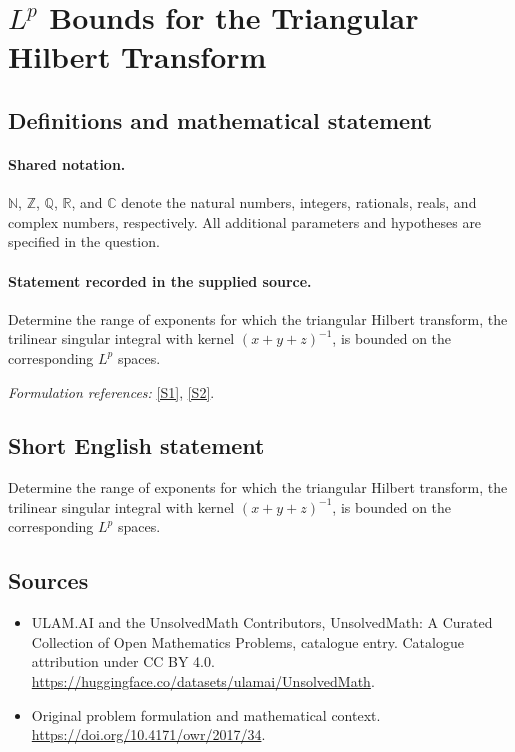 \documentclass[11pt]{article}
\newcommand{\sref}[2]{\hyperlink{source:#1:#2}{[S#2]}}
\begin{document}
\section{\texorpdfstring{$L^p$ Bounds for the Triangular Hilbert Transform}{L\textasciicircum{}p Bounds for the Triangular Hilbert Transform}}\label{statement}

\subsection{Definitions and mathematical statement}

\paragraph{Shared notation.}$\mathbb N$, $\mathbb Z$, $\mathbb Q$, $\mathbb R$, and $\mathbb C$ denote the natural numbers, integers, rationals, reals, and complex numbers, respectively. All additional parameters and hypotheses are specified in the question.


\paragraph{Statement recorded in the supplied source.}
Determine the range of exponents for which the triangular Hilbert transform, the trilinear singular integral with kernel $(x+y+z)^{-1}$, is bounded on the corresponding $L^p$ spaces.
\par\smallskip\textit{Formulation references:} \sref{statement}{1}, \sref{statement}{2}.
\subsection{Short English statement}
Determine the range of exponents for which the triangular Hilbert transform, the trilinear singular integral with kernel $(x+y+z)^{-1}$, is bounded on the corresponding $L^p$ spaces.
\subsection{Sources}
\begin{itemize}
\item[\hypertarget{source:statement:1}{S1}] ULAM.AI and the UnsolvedMath Contributors, UnsolvedMath: A Curated Collection of Open Mathematics Problems, catalogue entry. Catalogue attribution under CC BY 4.0.
\url{https://huggingface.co/datasets/ulamai/UnsolvedMath}.
\item[\hypertarget{source:statement:2}{S2}] Original problem formulation and mathematical context.
\url{https://doi.org/10.4171/owr/2017/34}.
\end{itemize}
\label{end:statement}
\end{document}
